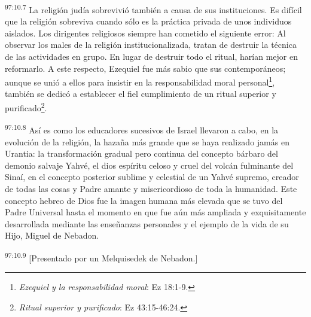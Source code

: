 \par
\textsuperscript{97:10.7} La religión judía sobrevivió también a causa de sus instituciones. Es difícil que la religión sobreviva cuando sólo es la práctica privada de unos individuos aislados. Los dirigentes religiosos siempre han cometido el siguiente error: Al observar los males de la religión institucionalizada, tratan de destruir la técnica de las actividades en grupo. En lugar de destruir todo el ritual, harían mejor en reformarlo. A este respecto, Ezequiel fue más sabio que sus contemporáneos; aunque se unió a ellos para insistir en la responsabilidad moral personal\footnote{\textit{Ezequiel y la responsabilidad moral}: Ez 18:1-9.}, también se dedicó a establecer el fiel cumplimiento de un ritual superior y purificado\footnote{\textit{Ritual superior y purificado}: Ez 43:15-46:24.}.

\par
\textsuperscript{97:10.8} Así es como los educadores sucesivos de Israel llevaron a cabo, en la evolución de la religión, la hazaña más grande que se haya realizado jamás en Urantia: la transformación gradual pero continua del concepto bárbaro del demonio salvaje Yahvé, el dios espíritu celoso y cruel del volcán fulminante del Sinaí, en el concepto posterior sublime y celestial de un Yahvé supremo, creador de todas las cosas y Padre amante y misericordioso de toda la humanidad. Este concepto hebreo de Dios fue la imagen humana más elevada que se tuvo del Padre Universal hasta el momento en que fue aún más ampliada y exquisitamente desarrollada mediante las enseñanzas personales y el ejemplo de la vida de su Hijo, Miguel de Nebadon.

\par
\textsuperscript{97:10.9} [Presentado por un Melquisedek de Nebadon.]